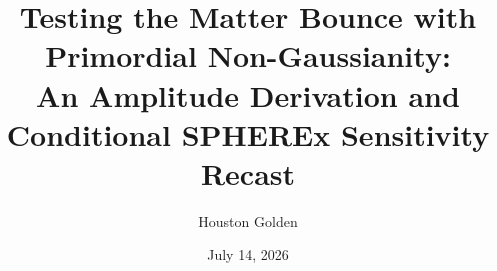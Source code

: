 \documentclass[aps,prd,twocolumn,superscriptaddress,showpacs,preprintnumbers,nofootinbib,longbibliography,floatfix]{revtex4-2}
\begin{document}

\title{Testing the Matter Bounce with Primordial Non-Gaussianity:\\
An Amplitude Derivation and Conditional SPHEREx Sensitivity Recast}

\author{Houston Golden}

\date{July 14, 2026}
\end{document}
